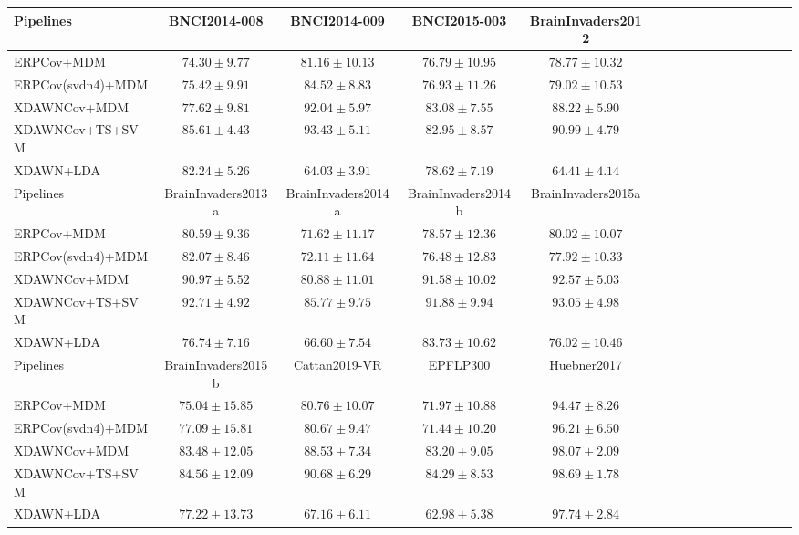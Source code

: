 \begin{tabular}{@{}lccccccccccccccc@{}}
\toprule
Pipelines & BNCI2014-008 & BNCI2014-009 & BNCI2015-003 & BrainInvaders2012 \\
\midrule
ERPCov+MDM & $74.30\pm9.77$ & $81.16\pm10.13$ & $76.79\pm10.95$ & $78.77\pm10.32$ \\
ERPCov(svdn4)+MDM & $75.42\pm9.91$ & $84.52\pm8.83$ & $76.93\pm11.26$ & $79.02\pm10.53$ \\
XDAWNCov+MDM & $77.62\pm9.81$ & $92.04\pm5.97$ & \boldmath$83.08\pm7.55$ & $88.22\pm5.90$ \\
XDAWNCov+TS+SVM & \boldmath$85.61\pm4.43$ & \boldmath$93.43\pm5.11$ & $82.95\pm8.57$ & \boldmath$90.99\pm4.79$ \\
XDAWN+LDA & $82.24\pm5.26$ & $64.03\pm3.91$ & $78.62\pm7.19$ & $64.41\pm4.14$ \\\midrule 
\midrule 
Pipelines & BrainInvaders2013a & BrainInvaders2014a & BrainInvaders2014b & BrainInvaders2015a \\
\midrule
ERPCov+MDM & $80.59\pm9.36$ & $71.62\pm11.17$ & $78.57\pm12.36$ & $80.02\pm10.07$ \\
ERPCov(svdn4)+MDM & $82.07\pm8.46$ & $72.11\pm11.64$ & $76.48\pm12.83$ & $77.92\pm10.33$ \\
XDAWNCov+MDM & $90.97\pm5.52$ & $80.88\pm11.01$ & $91.58\pm10.02$ & $92.57\pm5.03$ \\
XDAWNCov+TS+SVM & \boldmath$92.71\pm4.92$ & \boldmath$85.77\pm9.75$ & \boldmath$91.88\pm9.94$ & \boldmath$93.05\pm4.98$ \\
XDAWN+LDA & $76.74\pm7.16$ & $66.60\pm7.54$ & $83.73\pm10.62$ & $76.02\pm10.46$ \\\midrule 

\midrule 
Pipelines & BrainInvaders2015b & Cattan2019-VR & EPFLP300 & Huebner2017 \\
\midrule
ERPCov+MDM & $75.04\pm15.85$ & $80.76\pm10.07$ & $71.97\pm10.88$ & $94.47\pm8.26$ \\
ERPCov(svdn4)+MDM & $77.09\pm15.81$ & $80.67\pm9.47$ & $71.44\pm10.20$ & $96.21\pm6.50$ \\
XDAWNCov+MDM & $83.48\pm12.05$ & $88.53\pm7.34$ & $83.20\pm9.05$ & $98.07\pm2.09$ \\
XDAWNCov+TS+SVM & \boldmath$84.56\pm12.09$ & \boldmath$90.68\pm6.29$ & \boldmath$84.29\pm8.53$ & \boldmath$98.69\pm1.78$ \\
XDAWN+LDA & $77.22\pm13.73$ & $67.16\pm6.11$ & $62.98\pm5.38$ & $97.74\pm2.84$ \\\midrule 


\end{tabular}

